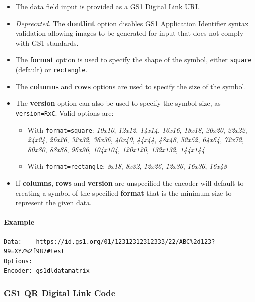 \begin{itemize}
\tightlist
\item
  The data field input is provided as a GS1 Digital Link URI.
\item
  \emph{Deprecated.} The \textbf{dontlint} option disables GS1
  Application Identifier syntax validation allowing images to be
  generated for input that does not comply with GS1 standards.
\item
  The \textbf{format} option is used to specify the shape of the symbol,
  either \texttt{square} (default) or \texttt{rectangle}.
\item
  The \textbf{columns} and \textbf{rows} options are used to specify the
  size of the symbol.
\item
  The \textbf{version} option can also be used to specify the symbol
  size, as \texttt{version=RxC}. Valid options are:

  \begin{itemize}
  \tightlist
  \item
    With \texttt{format=square}: \emph{10x10}, \emph{12x12},
    \emph{14x14}, \emph{16x16}, \emph{18x18}, \emph{20x20},
    \emph{22x22}, \emph{24x24}, \emph{26x26}, \emph{32x32},
    \emph{36x36}, \emph{40x40}, \emph{44x44}, \emph{48x48},
    \emph{52x52}, \emph{64x64}, \emph{72x72}, \emph{80x80},
    \emph{88x88}, \emph{96x96}, \emph{104x104}, \emph{120x120},
    \emph{132x132}, \emph{144x144}
  \item
    With \texttt{format=rectangle}: \emph{8x18}, \emph{8x32},
    \emph{12x26}, \emph{12x36}, \emph{16x36}, \emph{16x48}
  \end{itemize}
\item
  If \textbf{columns}, \textbf{rows} and \textbf{version} are
  unspecified the encoder will default to creating a symbol of the
  specified \textbf{format} that is the minimum size to represent the
  given data.
\end{itemize}

\hypertarget{example-6}{%
\paragraph{Example}\label{example-6}}

\begin{verbatim}
Data:    https://id.gs1.org/01/12312312312333/22/ABC%2d123?99=XYZ%2f987#test
Options: 
Encoder: gs1dldatamatrix
\end{verbatim}

\hypertarget{gs1-qr-digital-link-code}{%
\subsubsection{GS1 QR Digital Link
Code}\label{gs1-qr-digital-link-code}}

